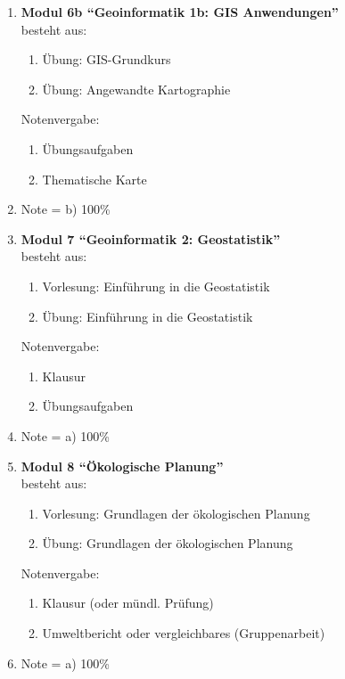\begin{enumerate}
 \item \textbf{Modul 6b ``Geoinformatik 1b: GIS Anwendungen''}  \\ besteht aus:
  \begin{enumerate}
   \item Übung: GIS-Grundkurs
   \item Übung: Angewandte Kartographie
  \end{enumerate}
  Notenvergabe:
  \begin{enumerate}
   \item Übungsaufgaben
   \item Thematische Karte
  \end{enumerate}
  \item[] Note = b) 100\%
    
 \item \textbf{Modul 7 ``Geoinformatik 2: Geostatistik''}  \\ besteht aus:
  \begin{enumerate}
   \item Vorlesung: Einführung in die Geostatistik
   \item Übung: Einführung in die Geostatistik
  \end{enumerate}
  Notenvergabe:
  \begin{enumerate}
   \item Klausur
   \item Übungsaufgaben
  \end{enumerate}
  \item[] Note = a) 100\%

 \item \textbf{Modul 8 ``Ökologische Planung''}  \\ besteht aus:
  \begin{enumerate}
   \item Vorlesung: Grundlagen der ökologischen Planung
   \item Übung: Grundlagen der ökologischen Planung
  \end{enumerate}
  Notenvergabe:
  \begin{enumerate}
   \item Klausur (oder mündl. Prüfung)
   \item Umweltbericht oder vergleichbares (Gruppenarbeit)
  \end{enumerate}
   \item[] Note = a) 100\%


\end{enumerate}
